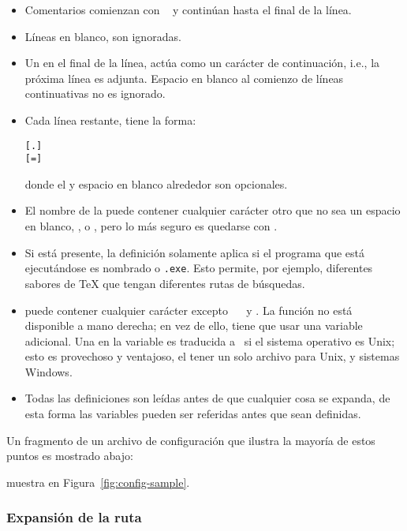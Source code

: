 \documentclass{article}
\begin{document}
\begin{itemize}
	\item 
		Comentarios comienzan con ~\code{\%} y
			continúan hasta el final de la línea.
		\item
			Líneas en blanco, son ignoradas.
		\item
			Un \bs{} en el final de la línea,
			actúa como un carácter de
			continuación, i.e., la próxima línea
			es adjunta. Espacio en blanco al
			comienzo de líneas continuativas no es
			ignorado. 
		\item
			Cada línea restante, tiene la forma:
			\begin{alltt}
				[.]
				[=] 
			\end{alltt}%
			donde el \samp{=} y espacio en blanco
			alrededor son opcionales. 
		\item
			El nombre de la  puede
			contener cualquier carácter otro que
			no sea un espacio en blanco, \samp{=},
			o , pero lo más seguro es
			quedarse con .
		\item
			Si  está
			presente, la definición solamente
			aplica si el programa que está
			ejecutándose es nombrado
			\texttt{} o
			\texttt{.exe}. Esto 
			permite, por ejemplo, diferentes
			sabores de \TeX{} que tengan
			diferentes rutas de búsquedas.
		\item {} puede contener cualquier
			carácter excepto ~\code{\%}~ y .
			La función
			 no está
			disponible a mano derecha; en vez de
			ello, tiene que usar una variable
			adicional. Una \samp{;} en la variable
			 es traducida a \samp{:}\
			si el sistema operativo es Unix; esto
			es provechoso y ventajoso, el tener un solo
			archivo  para Unix,
			 y sistemas Windows. 
		\item
			Todas las definiciones son leídas
			antes de que cualquier cosa se
			expanda, de esta forma las variables
			pueden ser referidas antes que sean
			definidas. 
	\end{itemize}
	Un fragmento de un archivo de configuración que
	ilustra la mayoría de estos puntos es
	\ifSingleColumn
	mostrado abajo:

	
	\else
	muestra en Figura~\ref{fig:config-sample}.
	\fi

	\subsubsection{Expansión de la ruta}
	\label{sec:path-expansion}
\end{document}
